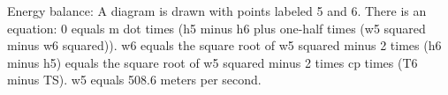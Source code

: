 Energy balance: A diagram is drawn with points labeled 5 and 6. There is an equation: 0 equals m dot times (h5 minus h6 plus one-half times (w5 squared minus w6 squared)). 
w6 equals the square root of w5 squared minus 2 times (h6 minus h5) equals the square root of w5 squared minus 2 times cp times (T6 minus TS). 
w5 equals 508.6 meters per second.